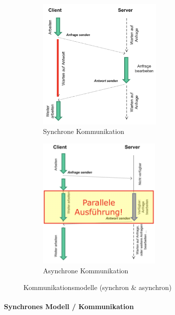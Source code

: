 \documentclass[a4paper]{article}
\begin{document}
		\begin{figure}[htb!]
			\centering
			\begin{subfigure}{.45\textwidth}
				\centering
				\includegraphics[keepaspectratio, height=6.5cm]{img/architecture/sync.png}
				\caption{Synchrone Kommunikation}
				\label{fig:synccomm}
			\end{subfigure}
			\begin{subfigure}{.45\textwidth}
				\centering
				\includegraphics[keepaspectratio, height=6.5cm]{img/architecture/async.png}
				\caption{Asynchrone Kommunikation}
				\label{fig:asynccomm}
			\end{subfigure}
			\caption{Kommunikationsmodelle (synchron \& asynchron)}
			\label{fig:commmodels}
		\end{figure}

				\paragraph{Synchrones Modell / Kommunikation}
		
\end{document}
